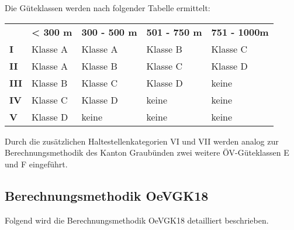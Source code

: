 \begin{itquote}
Die Güteklassen werden nach folgender Tabelle ermittelt:
\begin{table}[ht]
    \centering
    \begin{itquote}
    \begin{tabular}[c]{l p{2.9cm} p{2.9cm} p{2.9cm} p{2.9cm}}
        \midrule
        \textbf{}
                                & \textbf{< 300 m}
                                & \textbf{300 - 500 m}
                                & \textbf{501 - 750 m}
                                & \textbf{751 - 1000m}\\
        \textbf{I}
                                & Klasse A
                                & Klasse A
                                & Klasse B
                                & Klasse C\\
        \textbf{II}
                                & Klasse A
                                & Klasse B
                                & Klasse C
                                & Klasse D\\
        \textbf{III}
                                & Klasse B
                                & Klasse C
                                & Klasse D
                                & keine\\
        \textbf{IV}
                                & Klasse C
                                & Klasse D
                                & keine
                                & keine\\
        \textbf{V}
                                & Klasse D
                                & keine
                                & keine
                                & keine\\
        \bottomrule
    \end{tabular}
    \end{itquote}
\end{table}
\end{itquote}

Durch die zusätzlichen Haltestellenkategorien VI und VII werden analog zur Berechnungsmethodik des Kanton Graubünden zwei weitere ÖV-Güteklassen E und F eingeführt.

\subsection{Berechnungsmethodik OeVGK18}
\label{Berechnungsmethodik OeVGK18}
Folgend wird die Berechnungsmethodik \gls{OeVGK18} detailliert beschrieben.

